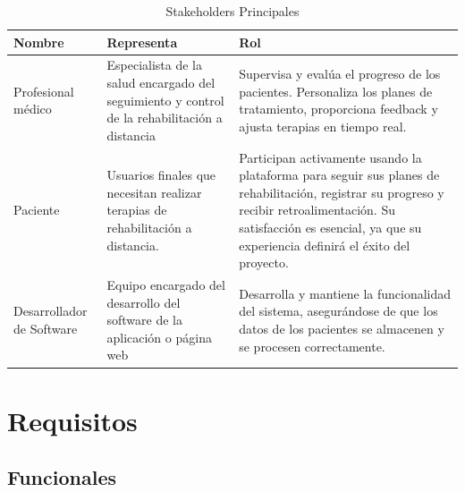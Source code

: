 \documentclass{article}
\begin{document}
	\begin{table}[ht]
		\centering
		\caption{Stakeholders Principales}
		\begin{tabular}{@{} p{3cm} p{6cm} p{7cm} @{}}
			\toprule
			\textbf{Nombre} & \textbf{Representa} & \textbf{Rol} \\
			\midrule
			Profesional médico & 
			Especialista de la salud encargado del seguimiento y control de la rehabilitación a distancia & 
			Supervisa y evalúa el progreso de los pacientes. \newline Personaliza los planes de tratamiento, proporciona feedback y ajusta terapias en tiempo real. \\
			
			\addlinespace
			
			Paciente & 
			Usuarios finales que necesitan realizar terapias de rehabilitación a distancia. & 
			Participan activamente usando la plataforma para seguir sus planes de rehabilitación, registrar su progreso y recibir retroalimentación. Su satisfacción es esencial, ya que su experiencia definirá el éxito del proyecto. \\
			
			\addlinespace
			
			Desarrollador de Software & 
			Equipo encargado del desarrollo del software de la aplicación o página web & 
			Desarrolla y mantiene la funcionalidad del sistema, asegurándose de que los datos de los pacientes se almacenen y se procesen correctamente. \\
			\bottomrule
		\end{tabular}
	\end{table}
	
	

	
	
	\section{Requisitos}
	
	\subsection{Funcionales}
	
\end{document}
